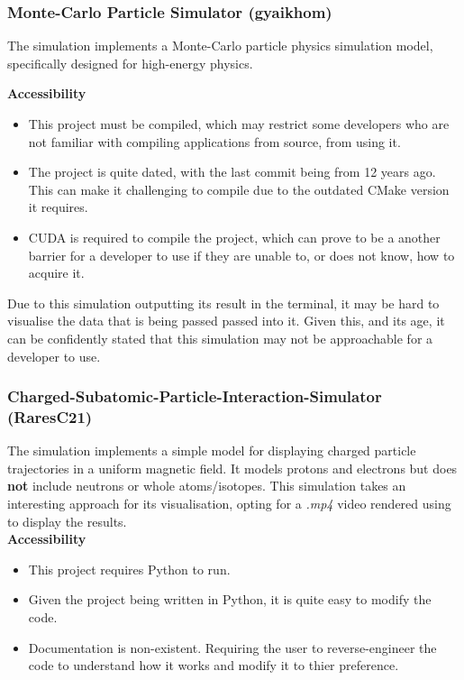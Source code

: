 \subsubsection*{Monte-Carlo Particle Simulator (gyaikhom)}

The simulation  implements a Monte-Carlo particle physics simulation model, specifically designed for high-energy physics.

\break{}

\textbf{Accessibility}

\begin{itemize}
    \item This project must be compiled, which may restrict some developers who are not familiar with compiling applications from source, from using it.
    \item The project is quite dated, with the last commit being from 12 years ago. This can make it challenging to compile due to the outdated CMake version it requires.
    \item CUDA is required to compile the project, which can prove to be a another barrier for a developer to use if they are unable to, or does not know, how to acquire it.
\end{itemize}

Due to this simulation outputting its result in the terminal, it may be hard to visualise the data that is being passed passed into it.
Given this, and its age, it can be confidently stated that this simulation may not be approachable for a developer to use.

\subsubsection*{Charged-Subatomic-Particle-Interaction-Simulator (RaresC21)}

The simulation  implements a simple model for displaying charged particle trajectories in a uniform magnetic field. It models protons and electrons but does \textbf{not} include neutrons or whole atoms/isotopes.
This simulation takes an interesting approach for its visualisation, opting for a \textit{.mp4} video rendered using  to display the results.
\\
\textbf{Accessibility}

\begin{itemize}
    \item This project requires Python to run.
    \item Given the project being written in Python, it is quite easy to modify the code.
    \item Documentation is non-existent. Requiring the user to reverse-engineer the code to understand how it works and modify it to thier preference.
\end{itemize}

